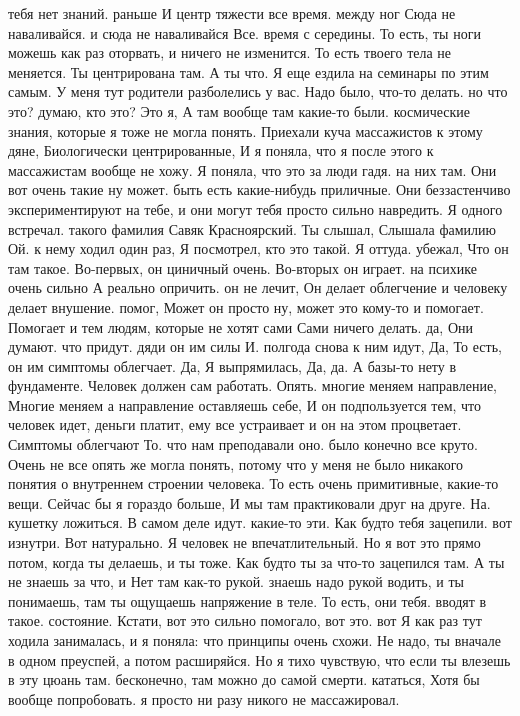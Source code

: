 тебя нет знаний.
раньше И центр тяжести все время.
между ног Сюда не наваливайся.
и сюда не наваливайся Все.
время с середины.
То есть, ты ноги можешь как раз оторвать, и ничего не изменится.
То есть твоего тела не меняется.
Ты центрирована там.
А ты что.
Я еще ездила на семинары по этим самым.
У меня тут родители разболелись у вас.
Надо было, что-то делать.
но что это?
думаю, кто это? Это я, А там вообще там какие-то были.
космические знания, которые я тоже не могла понять. Приехали куча массажистов к этому дяне, Биологически центрированные, И я поняла, что я после этого к массажистам вообще не хожу. Я поняла, что это за люди гадя.
на них там. Они вот очень такие ну может.
быть есть какие-нибудь приличные. Они беззастенчиво экспериментируют на тебе, и они могут тебя просто сильно навредить. Я одного встречал.
такого фамилия Савяк Красноярский. Ты слышал, Слышала фамилию Ой.
к нему ходил один раз, Я посмотрел, кто это такой. Я оттуда.
убежал, Что он там такое.
Во-первых, он циничный очень.
Во-вторых он играет.
на психике очень сильно А реально опричить. он не лечит, Он делает облегчение и
человеку делает внушение.
помог, Может он просто ну, может это кому-то и помогает. Помогает и тем людям, которые не хотят сами Сами ничего делать.
да, Они думают.
что придут. дяди он им силы И.
полгода снова к ним идут, Да, То есть, он им симптомы облегчает. Да, Я выпрямилась, Да, да.
А базы-то нету в фундаменте. Человек должен сам работать.
Опять. многие меняем направление, Многие меняем а направление оставляешь себе, И он подпользуется тем, что человек идет, деньги платит, ему все устраивает и он на этом процветает. Симптомы облегчают То.
что нам преподавали оно.
было конечно все круто.
Очень не все опять же могла понять, потому что у меня не было никакого понятия о внутреннем строении человека.
То есть очень примитивные, какие-то вещи.
Сейчас бы я гораздо больше, И мы там практиковали друг на друге.
На.
кушетку ложиться. В самом деле идут.
какие-то эти.
Как будто тебя зацепили. вот изнутри.
Вот натурально.
Я человек не впечатлительный.
Но я вот это прямо потом, когда ты делаешь, и ты тоже.
Как будто ты за что-то зацепился там.
А ты не знаешь за что, и Нет там как-то рукой. знаешь надо рукой водить, и ты понимаешь, там ты ощущаешь напряжение в теле.
То есть, они тебя.
вводят в такое.
состояние. Кстати, вот это сильно помогало, вот это. вот Я как раз тут ходила занималась, и я поняла:
что принципы очень схожи.
Не надо, ты вначале в одном преуспей, а потом расширяйся. Но я тихо чувствую, что если
ты влезешь в эту цюань там.
бесконечно, там можно до самой смерти.
кататься, Хотя бы вообще попробовать. я просто ни разу никого не массажировал.
